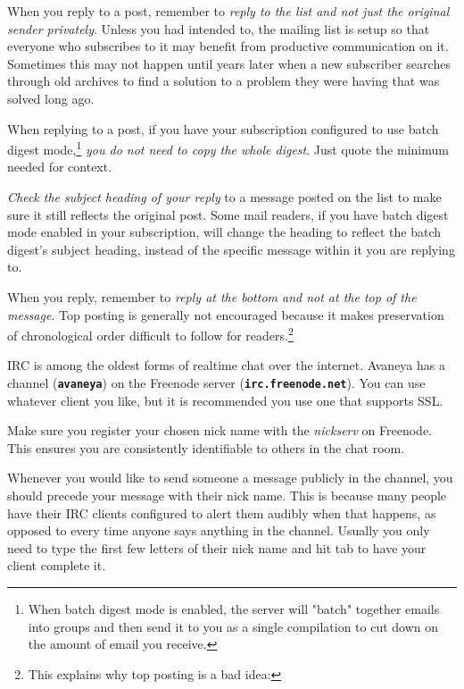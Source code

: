 \item
When you reply to a post, remember to {\it reply to the list and not just the original sender privately}. Unless you had intended to, the mailing list is setup so that everyone who subscribes to it may benefit from productive communication on it. Sometimes this may not happen until years later when a new subscriber searches through old archives to find a solution to a problem they were having that was solved long ago.

\item
When replying to a post, if you have your subscription configured to use batch digest mode,\footnote{When batch digest mode is enabled, the server will "batch" together emails into groups and then send it to you as a single compilation to cut down on the amount of email you receive.} {\it you do not need to copy the whole digest}. Just quote the minimum needed for context.

\item
{\it Check the subject heading of your reply} to a message posted on the list to make sure it still reflects the original post. Some mail readers, if you have batch digest mode enabled in your subscription, will change the heading to reflect the batch digest's subject heading, instead of the specific message within it you are replying to.

\item
When you reply, remember to {\it reply at the bottom and not at the top of the message}. Top posting is generally not encouraged because it makes preservation of chronological order difficult to follow for readers.\footnote{This explains why top posting is a bad idea: }
\stopitemize


IRC is among the oldest forms of realtime chat over the internet. Avaneya has a channel ({\bf \tt \type{#}avaneya}) on the Freenode server ({\bf \tt irc.freenode.net}). You can use whatever client you like, but it is recommended you use one that supports SSL.

Make sure you register your chosen nick name with the {\it nickserv} on Freenode. This ensures you are consistently identifiable to others in the chat room.

Whenever you would like to send someone a message publicly in the channel, you should precede your message with their nick name. This is because many people have their IRC clients configured to alert them audibly when that happens, as opposed to every time anyone says anything in the channel. Usually you only need to type the first few letters of their nick name and hit tab to have your client complete it.


